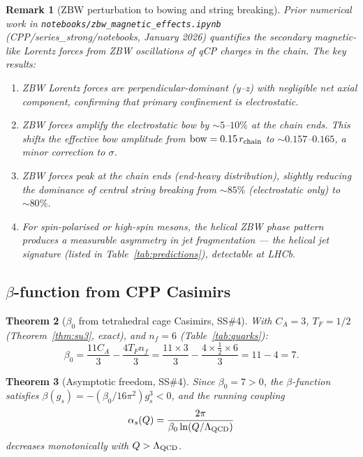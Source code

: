 \documentclass[11pt,a4paper]{article}
\newtheorem{theorem}{Theorem}[section]
\newtheorem{remark}[theorem]{Remark}
\newcommand{\as}{\alpha_s}
\begin{document}
\begin{remark}[ZBW perturbation to bowing and string breaking]
\label{rem:zbw_bow}
Prior numerical work in \texttt{notebooks/zbw\_magnetic\_effects.ipynb}
(CPP/series\_strong/notebooks, January 2026) quantifies the secondary
magnetic-like Lorentz forces from ZBW oscillations of qCP charges
in the chain.  The key results:
\begin{enumerate}
\item ZBW Lorentz forces are perpendicular-dominant (y--z) with
  negligible net axial component, confirming that primary
  confinement is electrostatic.
\item ZBW forces amplify the electrostatic bow by $\sim 5$--$10\%$
  at the chain ends.  This shifts the effective bow amplitude from
  $\text{bow} = 0.15\,r_{\rm chain}$ to $\sim 0.157$--$0.165$,
  a minor correction to $\sigma$.
\item ZBW forces peak at the chain ends (end-heavy distribution),
  slightly reducing the dominance of central string breaking from
  $\sim 85\%$ (electrostatic only) to $\sim 80\%$.
\item For spin-polarised or high-spin mesons, the helical ZBW phase
  pattern produces a measurable asymmetry in jet fragmentation ---
  the \emph{helical jet signature} (listed in
  Table~\ref{tab:predictions}), detectable at LHCb.
\end{enumerate}
\end{remark}

\subsection{$\beta$-function from CPP Casimirs}

\begin{theorem}[$\beta_0$ from tetrahedral cage Casimirs, SS\#4]
\label{thm:beta0}
With $C_A = 3$, $T_F = 1/2$ (Theorem~\ref{thm:su3}, exact), and
$n_f = 6$ (Table~\ref{tab:quarks}):
\begin{equation}
\beta_0 = \frac{11C_A}{3} - \frac{4T_F n_f}{3}
= \frac{11\times3}{3} - \frac{4\times\tfrac{1}{2}\times6}{3}
= 11 - 4 = 7.
\label{eq:beta0}
\end{equation}
\end{theorem}

\begin{theorem}[Asymptotic freedom, SS\#4]
\label{thm:af}
Since $\beta_0 = 7 > 0$, the $\beta$-function satisfies
$\beta(g_s) = -(\beta_0/16\pi^2)g_s^3 < 0$, and the running
coupling
\begin{equation}
\as(Q) = \frac{2\pi}{\beta_0\ln(Q/\Lambda_{\rm QCD})}
\label{eq:running}
\end{equation}
decreases monotonically with $Q > \Lambda_{\rm QCD}$.
\end{theorem}
\end{document}
